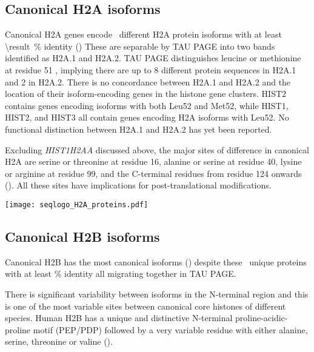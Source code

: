   \subsection{Canonical H2A isoforms}
    Canonical H2A genes encode \HTwoAUniqueProteins{}~different H2A
    protein isoforms with at least
     \SI{\result}{\percent} identity ()
    These are separable by TAU PAGE into two bands identified as H2A.1 and H2A.2.
    TAU PAGE distinguishes leucine or methionine at
    residue 51 \citep{FranklinZweidler1977,Zweidler1977},
    implying there are up to 8 different protein sequences in H2A.1 and 2 in H2A.2.
    There is no concordance between H2A.1 and H2A.2
    and the location of their isoform-encoding genes in the histone gene clusters.
    HIST2 contains genes encoding isoforms with both Leu52 and Met52,
    while HIST1, HIST2, and HIST3 all contain genes encoding H2A isoforms with Leu52.
    No functional distinction between H2A.1 and H2A.2 has yet been reported.

    Excluding \textit{HIST1H2AA} discussed above,
    the major sites of difference in canonical H2A are
    serine or threonine at residue 16,
    alanine or serine at residue 40,
    lysine or arginine at residue 99,
    and the C-terminal residues from residue 124 onwards ().
    All these sites have implications for post-translational modifications.

    \begin{table}
      \caption{%
        Canonical H2A protein isoforms.  Upper panel shows isoforms
        relative to the most common protein sequence.  Lower panel
        shows sequence logo of all isoforms aligned with invariant
        residues in grey.
      }
      \label{tab:H2A-consensus}
      
      \texttt{[image: seqlogo\_H2A\_proteins.pdf]}
    \end{table}

  \subsection{Canonical H2B isoforms}
    Canonical H2B has the most canonical isoforms ()
    despite these \HTwoBUniqueProteins{}~unique proteins
    with at least \result\% identity
    all migrating together in TAU PAGE.

    There is significant variability between isoforms in the N-terminal region
    and this is one of the most variable sites between canonical
    core histones of different species.
    Human H2B has a unique and distinctive N-terminal proline-acidic-proline motif (PEP/PDP)
    followed by a very variable residue with either alanine, serine,
    threonine or valine ().

